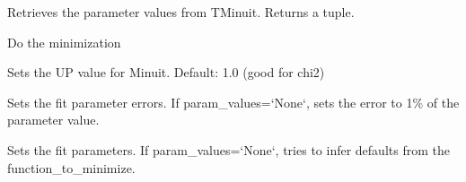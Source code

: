\documentclass[letterpaper,10pt,english]{sphinxmanual}
\begin{document}
\begin{fulllineitems}
\begin{fulllineitems}
\end{fulllineitems}


\begin{fulllineitems}
\label{api/kafe:kafe.minuit.Minuit.get_parameter_values}
Retrieves the parameter values from TMinuit. Returns a tuple.

\end{fulllineitems}


\begin{fulllineitems}
\label{api/kafe:kafe.minuit.Minuit.minimize}
Do the minimization

\end{fulllineitems}


\begin{fulllineitems}
\label{api/kafe:kafe.minuit.Minuit.reset}
\end{fulllineitems}


\begin{fulllineitems}
\label{api/kafe:kafe.minuit.Minuit.set_err}
Sets the UP value for Minuit. Default: 1.0 (good for chi2)

\end{fulllineitems}


\begin{fulllineitems}
\label{api/kafe:kafe.minuit.Minuit.set_parameter_errors}
Sets the fit parameter errors. If param\_values={}`None{}`, sets the error to 1\% of the parameter value.

\end{fulllineitems}


\begin{fulllineitems}
\label{api/kafe:kafe.minuit.Minuit.set_parameter_names}
Sets the fit parameters. If param\_values={}`None{}`, tries to infer defaults from the function\_to\_minimize.


\end{fulllineitems}
\end{fulllineitems}
\end{document}
